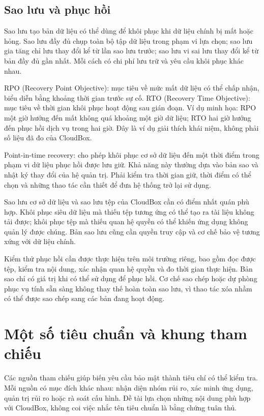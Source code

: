\subsection{Sao lưu và phục hồi}
Sao lưu tạo bản dữ liệu có thể dùng để khôi phục khi dữ liệu chính bị mất hoặc hỏng. Sao lưu đầy đủ chụp toàn bộ tập dữ liệu trong phạm vi lựa chọn; sao lưu gia tăng chỉ lưu thay đổi kể từ lần sao lưu trước; sao lưu vi sai lưu thay đổi kể từ bản đầy đủ gần nhất. Mỗi cách có chi phí lưu trữ và yêu cầu khôi phục khác nhau.

RPO (Recovery Point Objective): mục tiêu về mức mất dữ liệu có thể chấp nhận, biểu diễn bằng khoảng thời gian trước sự cố. RTO (Recovery Time Objective): mục tiêu về thời gian khôi phục hoạt động sau gián đoạn. Ví dụ minh họa: RPO một giờ hướng đến mất không quá khoảng một giờ dữ liệu; RTO hai giờ hướng đến phục hồi dịch vụ trong hai giờ. Đây là ví dụ giải thích khái niệm, không phải số liệu đã đo của CloudBox.

Point-in-time recovery: cho phép khôi phục cơ sở dữ liệu đến một thời điểm trong phạm vi dữ liệu phục hồi được lưu giữ. Khả năng này thường dựa vào bản sao và nhật ký thay đổi của hệ quản trị. Phải kiểm tra thời gian giữ, thời điểm có thể chọn và những thao tác cần thiết để đưa hệ thống trở lại sử dụng.

Sao lưu cơ sở dữ liệu và sao lưu tệp của CloudBox cần có điểm nhất quán phù hợp. Khôi phục siêu dữ liệu mà thiếu tệp tương ứng có thể tạo ra tài liệu không tải được; khôi phục tệp mà thiếu quan hệ quyền có thể khiến ứng dụng không quản lý được chúng. Bản sao lưu cũng cần quyền truy cập và cơ chế bảo vệ tương xứng với dữ liệu chính.

Kiểm thử phục hồi cần được thực hiện trên môi trường riêng, bao gồm đọc được tệp, kiểm tra nội dung, xác nhận quan hệ quyền và đo thời gian thực hiện. Bản sao chỉ có giá trị khi có thể sử dụng để phục hồi. Cơ chế sao chép hoặc dự phòng phục vụ tính sẵn sàng không thay thế hoàn toàn sao lưu, vì thao tác xóa nhầm có thể được sao chép sang các bản đang hoạt động.

\section{Một số tiêu chuẩn và khung tham chiếu}
Các nguồn tham chiếu giúp biến yêu cầu bảo mật thành tiêu chí có thể kiểm tra. Mỗi nguồn có mục đích khác nhau: nhận diện nhóm rủi ro, xác minh ứng dụng, quản trị rủi ro hoặc rà soát cấu hình. Đề tài lựa chọn những nội dung phù hợp với CloudBox, không coi việc nhắc tên tiêu chuẩn là bằng chứng tuân thủ.

